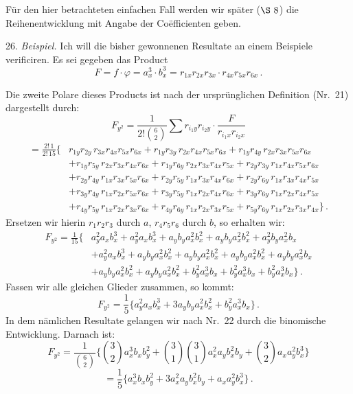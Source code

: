 \documentclass[11pt]{article}
\providecommand{\weberpage}[1]{}
\begin{document}
Für den hier betrachteten einfachen Fall werden wir später ($\S~8$) die Reihenentwicklung mit Angabe der Co\"efficienten geben.

26. \textit{Beispiel.} Ich will die bisher gewonnenen Resultate an einem Beispiele verificiren. Es sei gegeben das Product
\[
F=f\cdot\varphi=a_x^3\cdot b_x^3=r_{1x}r_{2x}r_{3x}\cdot r_{4x}r_{5x}r_{6x}\,.
\]


\weberpage{28}
Die zweite Polare dieses Products ist nach der ursprünglichen Definition (Nr.\ 21) dargestellt durch:
\[
F_{y^2}=\frac{1}{2!\binom{6}{2}}\sum r_{i_1y}r_{i_2y}\cdot\frac{F}{r_{i_1x}r_{i_2x}}
\]
\[
\begin{aligned}
=\frac{2!\,1}{2!\,15}\Big\{
&r_{1y}r_{2y}\,r_{3x}r_{4x}r_{5x}r_{6x}+r_{1y}r_{3y}\,r_{2x}r_{4x}r_{5x}r_{6x}+r_{1y}r_{4y}\,r_{2x}r_{3x}r_{5x}r_{6x}\\
&+r_{1y}r_{5y}\,r_{2x}r_{3x}r_{4x}r_{6x}+r_{1y}r_{6y}\,r_{2x}r_{3x}r_{4x}r_{5x}+r_{2y}r_{3y}\,r_{1x}r_{4x}r_{5x}r_{6x}\\
&+r_{2y}r_{4y}\,r_{1x}r_{3x}r_{5x}r_{6x}+r_{2y}r_{5y}\,r_{1x}r_{3x}r_{4x}r_{6x}+r_{2y}r_{6y}\,r_{1x}r_{3x}r_{4x}r_{5x}\\
&+r_{3y}r_{4y}\,r_{1x}r_{2x}r_{5x}r_{6x}+r_{3y}r_{5y}\,r_{1x}r_{2x}r_{4x}r_{6x}+r_{3y}r_{6y}\,r_{1x}r_{2x}r_{4x}r_{5x}\\
&+r_{4y}r_{5y}\,r_{1x}r_{2x}r_{3x}r_{6x}+r_{4y}r_{6y}\,r_{1x}r_{2x}r_{3x}r_{5x}+r_{5y}r_{6y}\,r_{1x}r_{2x}r_{3x}r_{4x}
\Big\}\,.
\end{aligned}
\]
Ersetzen wir hierin $r_1r_2r_3$ durch $a$, $r_4r_5r_6$ durch $b$, so erhalten wir:
\[
\begin{aligned}
F_{y^2}=\frac{1}{15}\Big\{
&a_y^2a_xb_x^3+a_y^2a_xb_x^3+a_yb_ya_x^2b_x^2+a_yb_ya_x^2b_x^2+a_y^2b_ya_x^2b_x\\
&+a_y^2a_xb_x^3+a_yb_ya_x^2b_x^2+a_yb_ya_x^2b_x^2+a_yb_ya_x^2b_x^2+a_yb_ya_x^2b_x\\
&+a_yb_ya_x^2b_x^2+a_yb_ya_x^2b_x^2+b_y^2a_x^3b_x+b_y^2a_x^3b_x+b_y^2a_x^3b_x
\Big\}\,.
\end{aligned}
\]
Fassen wir alle gleichen Glieder zusammen, so kommt:
\[
F_{y^2}=\frac{1}{5}\Big\{a_y^2a_xb_x^3+3a_yb_ya_x^2b_x^2+b_y^2a_x^3b_x\Big\}\,.
\]
In dem nämlichen Resultate gelangen wir nach Nr.\ 22 durch die binomische Entwicklung. Darnach ist:
\[
F_{y^2}=\frac{1}{\binom{6}{2}}\Big\{\binom{3}{2}a_x^3b_xb_y^2+\binom{3}{1}\binom{3}{1}a_x^2a_yb_x^2b_y+\binom{3}{2}a_xa_y^2b_x^3\Big\}
\]
\[
=\frac{1}{5}\Big\{a_x^3b_xb_y^2+3a_x^2a_yb_x^2b_y+a_xa_y^2b_x^3\Big\}\,.
\]
\end{document}

